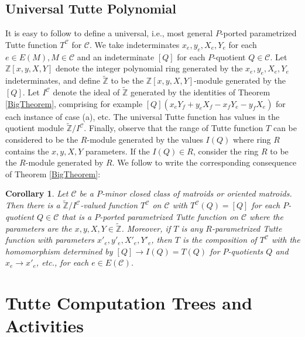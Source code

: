 \documentclass[12pt,leqno]{amsart}
\newtheorem{cor}[lem]{Corollary}
\theoremstyle{remark}
\begin{document}
\subsection{Universal Tutte Polynomial}
\label{UniversalSec}
It is easy to follow 
\cite{BollobasRiordanTuttePolyColored,Ellis-Monaghan-Traldi} to define
a universal, i.e., most general $P$-ported parametrized
Tutte function $T^{\mathcal{C}}$ for $\mathcal{C}$.
We take indeterminates $x_e, y_e, X_e, Y_e$ for each $e\in E(M), 
M\in\mathcal{C}$
and an indeterminate $[Q]$ for each $P$-quotient $Q\in\mathcal{C}$.
Let $\mathbb{Z}[x,y,X,Y]$ denote the integer polynomial ring generated by
the $x_e,y_e,X_e,Y_e$ indeterminates, and define $\widetilde{\mathbb{Z}}$
to be the $\mathbb{Z}[x,y,X,Y]$-module generated by the $[Q]$.  
Let $I^{\mathcal{C}}$ denote the ideal of $\widetilde{\mathbb{Z}}$ 
generated by the identities of Theorem \ref{BigTheorem}, comprising 
for example $[Q](x_eY_f+y_eX_f-x_fY_e-y_fX_e)$ for each instance of
case (a), etc.  The universal Tutte function has values in the
quotient module $\widetilde{\mathbb{Z}}/I^{\mathcal{C}}$.  Finally,
observe that the range of Tutte function $T$  can be considered to be the
$R$-module generated by the values $I(Q)$ where ring $R$ contains the
$x,y,X,Y$ parameters. If the $I(Q)\in R$, consider
the ring $R$ to be the $R$-module generated by $R$.
We follow \cite{Ellis-Monaghan-Traldi} to write
the corresponding consequence of Theorem \ref{BigTheorem}:

\begin{cor}
\label{UniversalCor}
Let $\mathcal{C}$ be a $P$-minor closed class of matroids or 
oriented matroids.  Then there is a 
$\widetilde{\mathbb{Z}}/I^{\mathcal{C}}$-valued function 
$T^{\mathcal{C}}$ on $\mathcal{C}$ with $T^{\mathcal{C}}(Q)=[Q]$ for each $P$-quotient
$Q\in\mathcal{C}$ that is a $P$-ported parametrized Tutte function
on $\mathcal{C}$ where the parameters are the 
$x, y, X, Y \in \widetilde{\mathbb{Z}}$.  Moreover, if $T$ is any $R$-parametrized
Tutte function with parameters $x'_e, y'_e, X'_e, Y'_e$, then $T$ is the
composition of $T^{\mathcal{C}}$ with the homomorphism determined by
$[Q]\rightarrow I(Q)=T(Q)$ for $P$-quotients $Q$ and 
$x_e\rightarrow x'_e$, etc., for each $e\in E(\mathcal{C})$.
\end{cor}

\section{Tutte Computation Trees and Activities}
\label{Activity}
\end{document}
